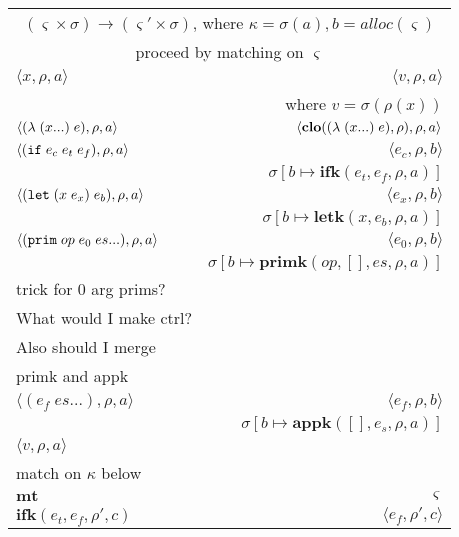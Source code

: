 \documentclass[12pt,draft]{article}
\begin{document}
\newpage


\begin{center}
\begin{tabular}{l | r}
\multicolumn{2}{c}{$(\varsigma \times \sigma) \rightarrow (\varsigma' \times \sigma)$, 
where $\kappa = \sigma(a) , b = alloc(\varsigma) $} \\
\multicolumn{2}{c}{proceed by matching on $\varsigma$} \\
\hline
$\langle
x , \rho , a
\rangle$
&$\langle
v , \rho , a
\rangle$ \\
& where $v = \sigma(\rho(x))$ \\
\hline
$\langle
(\lambda\;(x ...)\;e) , \rho , a
\rangle$
&$\langle
\textbf{clo}((\lambda\;(x ...)\;e), \rho) , \rho , a 
\rangle$ \\
\hline
$\langle
(\texttt{if}\;e_c\;e_t\;e_f) , \rho , a
\rangle$
&$\langle
e_c , \rho , b 
\rangle$ \\
& $\sigma[b \mapsto \textbf{ifk}(e_t , e_f , \rho , a)]$ \\
\hline
$\langle
(\texttt{let}\;(x\;e_x)\;e_b) , \rho , a
\rangle$
&$\langle
e_x , \rho , b
\rangle$ \\
& $\sigma[b \mapsto \textbf{letk}(x , e_b , \rho , a)]$ \\
\hline
$\langle
(\texttt{prim}\;op\;e_0\;es ...) , \rho , a
\rangle$
&$\langle
e_0 , \rho , b
\rangle$ \\
& $\sigma[b \mapsto \textbf{primk}(op , [] ,  es , \rho , a)]$ \\
trick for 0 arg prims? \\
What would I make ctrl? \\
Also should I merge \\ primk and appk \\
\hline
$\langle
(e_f \; es ...) , \rho , a
\rangle$
&$\langle
e_f , \rho , b
\rangle$ \\
& $\sigma[b \mapsto \textbf{appk}([] , e_s , \rho , a)]$ \\
\hline
$\langle v , \rho , a \rangle$ & \\
match on $\kappa$ below \\
\hline
$ \textbf{mt}$ 
& $\varsigma$ \\
\hline
$ \textbf{ifk}(e_t , e_f , \rho' , c) $ 
& $\langle e_f , \rho' , c \rangle$ \\

\end{tabular}
\end{center}
\end{document}
